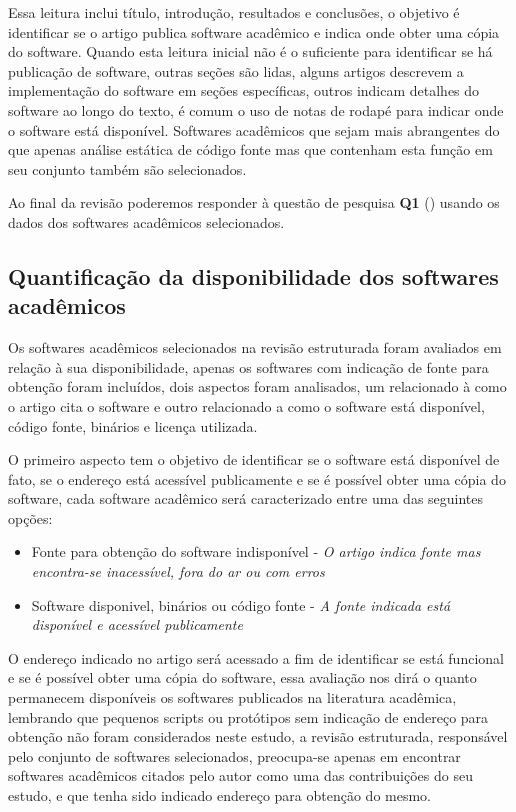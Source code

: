 \begin{description}
    Essa leitura inclui título, introdução, resultados e conclusões, o objetivo
    é identificar se o artigo publica software acadêmico e indica onde obter
    uma cópia do software. Quando esta leitura inicial não é o suficiente para
    identificar se há publicação de software, outras seções são lidas, alguns
    artigos descrevem a implementação do software em seções específicas, outros
    indicam detalhes do software ao longo do texto, é comum o uso de
    notas de rodapé para indicar onde o software está disponível. Softwares
    acadêmicos que sejam mais abrangentes do que apenas análise estática de
    código fonte mas que contenham esta função em seu conjunto também são
    selecionados.

\end{description}

Ao final da revisão poderemos responder à questão de pesquisa {\bf Q1}
(\QuestaoUm) usando os dados dos softwares acadêmicos selecionados.

\subsection{Quantificação da disponibilidade dos softwares acadêmicos}

Os softwares acadêmicos selecionados na revisão estruturada foram avaliados em
relação à sua disponibilidade, apenas os softwares com indicação de fonte para
obtenção foram incluídos, dois aspectos foram analisados, um relacionado à como
o artigo cita o software e outro relacionado a como o software está disponível,
código fonte, binários e licença utilizada.

O primeiro aspecto tem o objetivo de identificar se o software está disponível
de fato, se o endereço está acessível publicamente e se é possível obter uma
cópia do software, cada software acadêmico será caracterizado entre uma das
seguintes opções:

\begin{itemize}
  \item Fonte para obtenção do software indisponível -
    {\it O artigo indica fonte mas encontra-se inacessível, fora do ar ou com erros}
  \item Software disponivel, binários ou código fonte -
    {\it A fonte indicada está disponível e acessível publicamente}
\end{itemize}

O endereço indicado no artigo será acessado a fim de identificar se está
funcional e se é possível obter uma cópia do software, essa avaliação nos dirá
o quanto permanecem disponíveis os softwares publicados na literatura
acadêmica, lembrando que pequenos scripts ou protótipos sem indicação de
endereço para obtenção não foram considerados neste estudo, a revisão
estruturada, responsável pelo conjunto de softwares selecionados, preocupa-se
apenas em encontrar softwares acadêmicos citados pelo autor como uma das
contribuições do seu estudo, e que tenha sido indicado endereço para obtenção do
mesmo.

